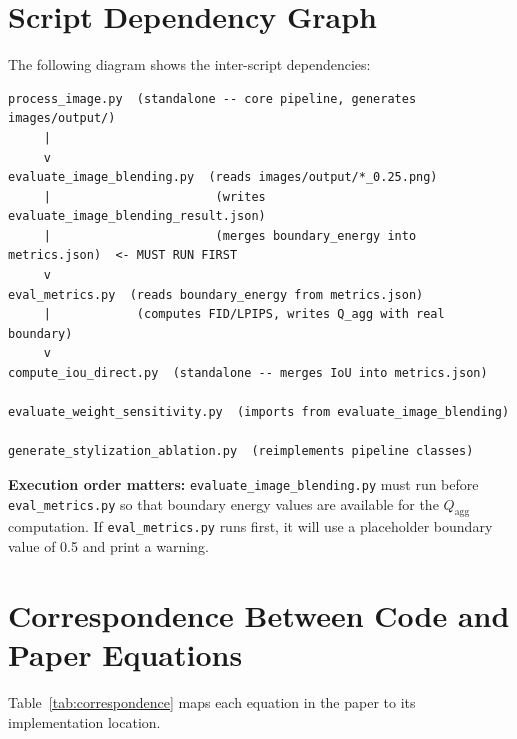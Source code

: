 \documentclass[11pt,a4paper]{article}
\begin{document}
\section{Script Dependency Graph}

The following diagram shows the inter-script dependencies:

\begin{verbatim}
process_image.py  (standalone -- core pipeline, generates images/output/)
     |
     v
evaluate_image_blending.py  (reads images/output/*_0.25.png)
     |                       (writes evaluate_image_blending_result.json)
     |                       (merges boundary_energy into metrics.json)  <- MUST RUN FIRST
     v
eval_metrics.py  (reads boundary_energy from metrics.json)
     |            (computes FID/LPIPS, writes Q_agg with real boundary)
     v
compute_iou_direct.py  (standalone -- merges IoU into metrics.json)

evaluate_weight_sensitivity.py  (imports from evaluate_image_blending)

generate_stylization_ablation.py  (reimplements pipeline classes)
\end{verbatim}

\textbf{Execution order matters:} \texttt{evaluate\_image\_blending.py} must run before \texttt{eval\_metrics.py} so that boundary energy values are available for the $Q_{\text{agg}}$ computation. If \texttt{eval\_metrics.py} runs first, it will use a placeholder boundary value of 0.5 and print a warning.

\section{Correspondence Between Code and Paper Equations}

Table~\ref{tab:correspondence} maps each equation in the paper to its implementation location.
\end{document}
